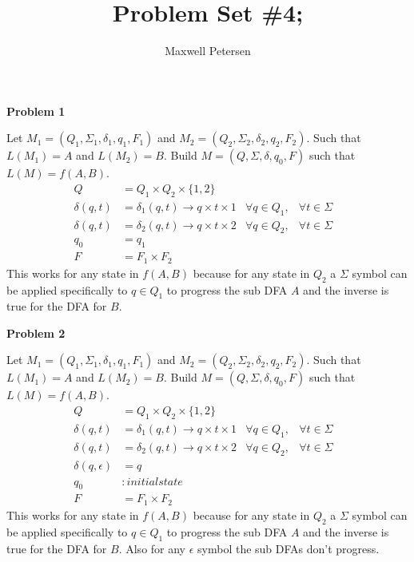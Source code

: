 \documentclass[letterpaper,12pt]{article}
\title{Problem Set \#4;}
\author{Maxwell Petersen}
\makeatletter
\newcommand\exercise[1]{\par\vspace{4ex}\normalfont\normalsize\noindent
\textbf{\large Problem #1}\par\nobreak\@afterindentfalse\@afterheading}
\makeatother
\begin{document}
\maketitle

\exercise{1}
Let $M_1 = (Q_1, \Sigma_1, \delta_1, q_1, F_1)$ and $M_2 = (Q_2, \Sigma_2, \delta_2, q_2, F_2)$. Such that $L(M_1) = A$ and  $L(M_2) = B$. Build $M = (Q, \Sigma, \delta, q_0, F)$ such that $L(M) = f(A, B)$.\\
\begin{align*}
Q &=Q_1 \times Q_2 \times \{1,2\}\\
\delta(q, t) &=\delta_1(q, t)\rightarrow q \times t \times 1& \forall q \in Q_1,&\forall t \in \Sigma&\\
\delta(q, t) &=\delta_2(q, t)\rightarrow q \times t \times 2& \forall q \in Q_2,&\forall t \in \Sigma&\\
q_0&= q_1\\
F&= F_1 \times F_2
\end{align*}
This works for any state in $f(A, B)$ because for any state in $Q_2$ a $\Sigma$ symbol can be applied specifically to $q\in Q_1$ to progress the sub DFA $A$ and the inverse is true for the DFA for $B$.

\exercise{2}
Let $M_1 = (Q_1, \Sigma_1, \delta_1, q_1, F_1)$ and $M_2 = (Q_2, \Sigma_2, \delta_2, q_2, F_2)$. Such that $L(M_1) = A$ and  $L(M_2) = B$. Build $M = (Q, \Sigma, \delta, q_0, F)$ such that $L(M) = f(A, B)$.\\
\begin{align*}
Q &=Q_1 \times Q_2 \times \{1,2\}\\
\delta(q, t) &=\delta_1(q, t)\rightarrow q \times t \times 1& \forall q \in Q_1,&\forall t \in \Sigma&\\
\delta(q, t) &=\delta_2(q, t)\rightarrow q \times t \times 2& \forall q \in Q_2,&\forall t \in \Sigma&\\
\delta(q, \epsilon) &= q\\
q_0&: initial state\\
F&= F_1 \times F_2
\end{align*}
This works for any state in $f(A, B)$ because for any state in $Q_2$ a $\Sigma$ symbol can be applied specifically to $q\in Q_1$ to progress the sub DFA $A$ and the inverse is true for the DFA for $B$. Also for any $\epsilon$ symbol the sub DFAs don't progress.
\end{document}
